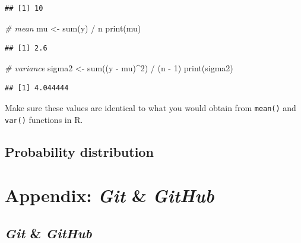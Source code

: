 \documentclass[
]{book}
\newenvironment{Shaded}{\begin{snugshade}}{\end{snugshade}}
\newcommand{\CommentTok}[1]{\textcolor[rgb]{0.56,0.35,0.01}{\textit{#1}}}
\newcommand{\DecValTok}[1]{\textcolor[rgb]{0.00,0.00,0.81}{#1}}
\newcommand{\FunctionTok}[1]{\textcolor[rgb]{0.00,0.00,0.00}{#1}}
\newcommand{\NormalTok}[1]{#1}
\newcommand{\OtherTok}[1]{\textcolor[rgb]{0.56,0.35,0.01}{#1}}
\newcommand{\SpecialCharTok}[1]{\textcolor[rgb]{0.00,0.00,0.00}{#1}}
\begin{document}
\begin{verbatim}
## [1] 10
\end{verbatim}

\begin{Shaded}
\begin{Highlighting}[]
\CommentTok{\# mean}
\NormalTok{mu }\OtherTok{\textless{}{-}} \FunctionTok{sum}\NormalTok{(y) }\SpecialCharTok{/}\NormalTok{ n}
\FunctionTok{print}\NormalTok{(mu)}
\end{Highlighting}
\end{Shaded}

\begin{verbatim}
## [1] 2.6
\end{verbatim}

\begin{Shaded}
\begin{Highlighting}[]
\CommentTok{\# variance}
\NormalTok{sigma2 }\OtherTok{\textless{}{-}} \FunctionTok{sum}\NormalTok{((y }\SpecialCharTok{{-}}\NormalTok{ mu)}\SpecialCharTok{\^{}}\DecValTok{2}\NormalTok{) }\SpecialCharTok{/}\NormalTok{ (n }\SpecialCharTok{{-}} \DecValTok{1}\NormalTok{)}
\FunctionTok{print}\NormalTok{(sigma2)}
\end{Highlighting}
\end{Shaded}

\begin{verbatim}
## [1] 4.044444
\end{verbatim}

Make sure these values are identical to what you would obtain from \texttt{mean()} and \texttt{var()} functions in R.

\hypertarget{probability-distribution}{%
\section{Probability distribution}\label{probability-distribution}}

\hypertarget{appendix-git-github}{%
\chapter{\texorpdfstring{Appendix: \emph{Git} \& \emph{GitHub}}{Appendix: Git \& GitHub}}\label{appendix-git-github}}

\hypertarget{git-github}{%
\section{\texorpdfstring{\emph{Git} \& \emph{GitHub}}{Git \& GitHub}}\label{git-github}}
\end{document}
